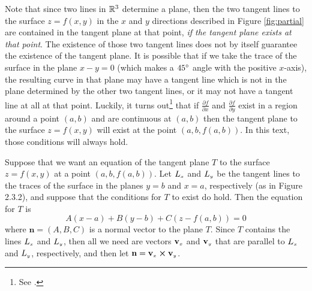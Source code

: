 Note that since two lines in $\mathbb{R}^{3}$ determine a plane, then the two tangent lines to the surface $z=f(x,y)$ in the
$x$ and $y$ directions described in Figure \ref{fig:partial} are contained in the tangent plane at that point, \emph{if
the tangent plane exists at that point}.
The existence of those two tangent lines does not by itself guarantee the
existence of the tangent plane. It is possible that if we take the trace of the surface in the plane $x-y=0$ (which
makes a $45^\circ$ angle with the positive $x$-axis), the resulting curve in that plane may have a tangent line
which is not in the plane determined by the other two tangent lines, or it may not have a tangent line at all at that
point. Luckily, it turns out\footnote{See \cite[\S\,6.4]{tm}.} that if $\frac{\partial f}{\partial x}$ and
$\frac{\partial f}{\partial y}$ exist in a region around a point $(a,b)$ and are continuous at $(a,b)$ then the
tangent plane to the surface $z=f(x,y)$ will exist at the point $(a,b,f(a,b))$. In this text, those conditions will
always hold.

Suppose that we want an equation of the tangent plane $T$ to the surface $z=f(x,y)$ at a point $(a,b,f(a,b))$.
Let $L_{\scriptscriptstyle x}$ and $L_{\scriptscriptstyle y}$ be the tangent lines to the traces of the surface in the planes $y=b$ and $x=a$,
respectively (as in Figure 2.3.2), and suppose that the conditions for $T$ to exist do hold. Then the
equation for $T$ is
\begin{equation}
 A(x-a)+B(y-b)+C(z-f(a,b))=0
\end{equation}
where $\mathbf{n}=(A,B,C)$ is a normal vector to the plane $T$. Since $T$ contains the lines $L_{\scriptscriptstyle x}$ and
$L_{\scriptscriptstyle y}$, then all we need are vectors $\mathbf{v}_{\scriptscriptstyle x}$ and $\mathbf{v}_{\scriptscriptstyle y}$ that are parallel to
$L_{\scriptscriptstyle x}$ and
$L_{\scriptscriptstyle y}$, respectively, and then let $\mathbf{n}=\mathbf{v}_{\scriptscriptstyle x} \bm{\times} \mathbf{v}_{\scriptscriptstyle y}$.

